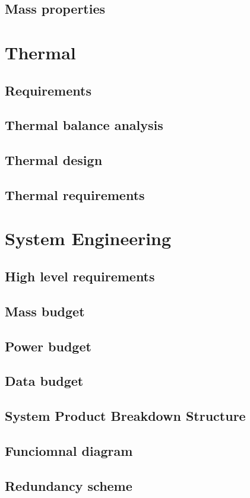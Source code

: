 \subsection{Mass properties}

\section{Thermal} 
\subsection{Requirements}
\subsection{Thermal balance analysis}
\subsection{Thermal design}
\subsection{Thermal requirements}

\section{System Engineering} 
\subsection{High level requirements}
\subsection{Mass budget}
\subsection{Power budget}
\subsection{Data budget}
\subsection{System Product Breakdown Structure}
\subsection{Funciomnal diagram} 
\subsection{Redundancy scheme}
